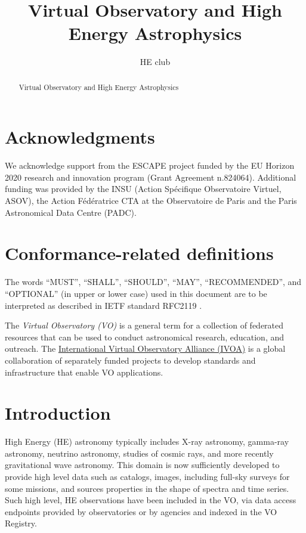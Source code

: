 \documentclass[11pt,a4paper]{ivoa}
\title{Virtual Observatory and High Energy Astrophysics}
\author{HE club}
\begin{document}
\begin{abstract}
Virtual Observatory and High Energy Astrophysics
\end{abstract}


\section*{Acknowledgments}

We acknowledge support from the ESCAPE project funded by the EU Horizon 2020 research and innovation program (Grant Agreement n.824064). Additional funding was provided by the INSU (Action Sp\'ecifique Observatoire Virtuel, ASOV), the Action F\'ed\'eratrice CTA at the Observatoire de Paris and the Paris Astronomical Data Centre (PADC).

\section*{Conformance-related definitions}

The words ``MUST'', ``SHALL'', ``SHOULD'', ``MAY'', ``RECOMMENDED'', and
``OPTIONAL'' (in upper or lower case) used in this document are to be
interpreted as described in IETF standard RFC2119 \citep{std:RFC2119}.

The \emph{Virtual Observatory (VO)} is a
general term for a collection of federated resources that can be used
to conduct astronomical research, education, and outreach.
The \href{https://www.ivoa.net}{International
Virtual Observatory Alliance (IVOA)} is a global
collaboration of separately funded projects to develop standards and
infrastructure that enable VO applications.


\section{Introduction}


High Energy (HE) astronomy typically includes X-ray astronomy, gamma-ray astronomy, neutrino astronomy, studies of cosmic rays, and more recently gravitational wave astronomy. This domain is now sufficiently developed to provide high level data such as catalogs, images, including full-sky surveys for some missions, and sources properties in the shape of spectra and time series.
Such high level, HE observations have been included in the VO, via data access endpoints provided by observatories or by agencies and indexed in the VO Registry.
\end{document}

